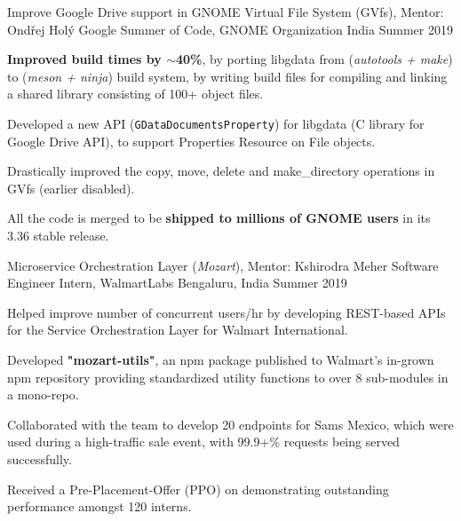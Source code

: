 \begin{cventries}

  \cventry
  {Improve Google Drive support in GNOME Virtual File System (GVfs), Mentor: Ondřej Holý}
  {Google Summer of Code, GNOME Organization}
  {India}
  {Summer 2019}
  {
    \begin{cvitems}
    \item \textbf{Improved build times by $\sim$40\%}, by porting libgdata from (\textit{autotools + make}) to (\textit{meson + ninja}) build system, by writing build files for compiling and linking a shared library consisting of 100+ object files.
    \item Developed a new API (\texttt{GDataDocumentsProperty}) for libgdata (C library for Google Drive API), to support Properties Resource on File objects.
    \item Drastically improved the copy, move, delete and make\_directory operations in GVfs (earlier disabled).
    \item All the code is merged to be \textbf{shipped to millions of GNOME users} in its 3.36 stable release.
    \end{cvitems}
  }

  \cventry
  {Microservice Orchestration Layer (\textit{Mozart}), Mentor: Kshirodra Meher}
  {Software Engineer Intern, WalmartLabs}
  {Bengaluru, India}
  {Summer 2019}
  {
    \begin{cvitems}
    \item Helped improve number of concurrent users/hr by developing REST-based APIs for the Service Orchestration Layer for Walmart International.
    \item Developed \textbf{"mozart-utils"}, an npm package published to Walmart's in-grown npm repository providing standardized utility functions to over 8 sub-modules in a mono-repo.
    \item Collaborated with the team to develop 20 endpoints for Sams Mexico, which were used during a high-traffic sale event, with 99.9+\% requests being served successfully.
    \item Received a Pre-Placement-Offer (PPO) on demonstrating outstanding performance amongst 120 interns.
    \end{cvitems}
  }


\end{cventries}
